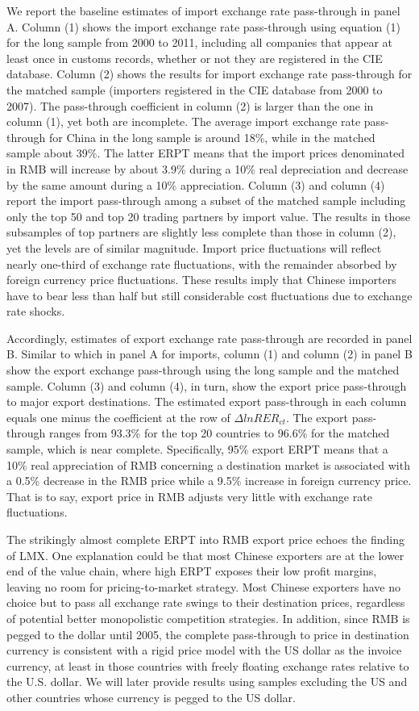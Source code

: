 \documentclass[12pt]{article}
\begin{document}
We report the baseline estimates of import exchange rate pass-through in panel A. Column (1) shows the import exchange rate pass-through using equation (1) for the long sample from 2000 to 2011, including all companies that appear at least once in customs records, whether or not they are registered in the CIE database. Column (2) shows the results for import exchange rate pass-through for the matched sample (importers registered in the CIE database from 2000 to 2007). The pass-through coefficient in column (2) is larger than the one in column (1), yet both are incomplete. The average import exchange rate pass-through for China in the long sample is around 18\%, while in the matched sample about 39\%. The latter ERPT means that the import prices denominated in RMB will increase by about 3.9\% during a 10\% real depreciation and decrease by the same amount during a 10\% appreciation. Column (3) and column (4) report the import pass-through among a subset of the matched sample including only the top 50 and top 20 trading partners by import value. The results in those subsamples of top partners are slightly less complete than those in column (2), yet the levels are of similar magnitude. Import price fluctuations will reflect nearly one-third of exchange rate fluctuations, with the remainder absorbed by foreign currency price fluctuations. These results imply that Chinese importers have to bear less than half but still considerable cost fluctuations due to exchange rate shocks. 

Accordingly, estimates of export exchange rate pass-through are recorded in panel B. Similar to which in panel A for imports, column (1) and column (2) in panel B show the export exchange pass-through using the long sample and the matched sample. Column (3) and column (4), in turn, show the export price pass-through to major export destinations. The estimated export pass-through in each column equals one minus the coefficient at the row of $\Delta lnRER_{ct}$. The export pass-through ranges from 93.3\% for the top 20 countries to 96.6\% for the matched sample, which is near complete. Specifically, 95\% export ERPT means that a 10\% real appreciation of RMB concerning a destination market is associated with a 0.5\% decrease in the RMB price while a 9.5\% increase in foreign currency price. That is to say, export price in RMB adjusts very little with exchange rate fluctuations.

The strikingly almost complete ERPT into RMB export price echoes the finding of LMX\cite{lmx2015}. One explanation could be that most Chinese exporters are at the lower end of the value chain, where high ERPT exposes their low profit margins, leaving no room for pricing-to-market strategy. Most Chinese exporters have no choice but to pass all exchange rate swings to their destination prices, regardless of potential better monopolistic competition strategies. In addition, since RMB is pegged to the dollar until 2005, the complete pass-through to price in destination currency is consistent with a rigid price model with the US dollar as the invoice currency, at least in those countries with freely floating exchange rates relative to the U.S. dollar. We will later provide results using samples excluding the US and other countries whose currency is pegged to the US dollar.
\end{document}
